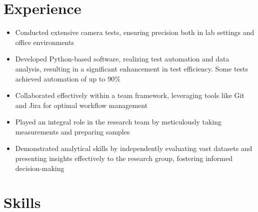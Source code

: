 \documentclass[11pt,a4paper,sans]{moderncv}
\begin{document}
\section{Experience}
{
    \begin{itemize}
    \item Conducted extensive camera tests, ensuring precision both in lab settings and office environments
    \item Developed Python-based software, realizing test automation and data analysis, resulting in a significant enhancement in test efficiency. Some tests achieved automation of up to 90\%
    \item Collaborated effectively within a team framework, leveraging tools like Git and Jira for optimal workflow management 
    \end{itemize}
}
{
    \begin{itemize}
    \item Played an integral role in the research team by meticulously taking measurements and preparing samples
    \item Demonstrated analytical skills by independently evaluating vast datasets and presenting insights effectively to the research group, fostering informed decision-making
    \end{itemize}
}

\section{Skills}
\cvitem{}{}

\end{document}
